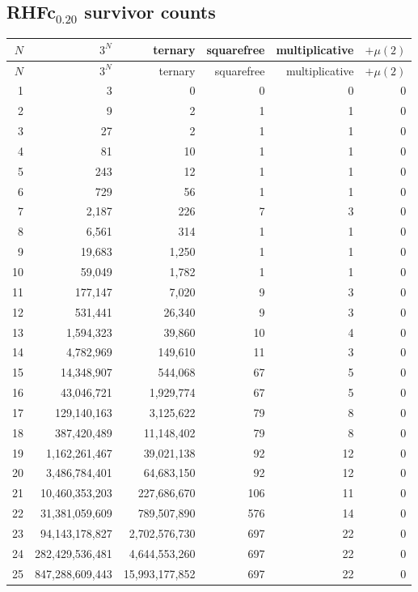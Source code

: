 \documentclass[11pt]{article}
\begin{document}
\subsection{RHFc$_{0.20}$ survivor counts}
\begin{center}\scriptsize\begin{longtable}{r r r r r r}
\toprule $N$ & $3^N$ & ternary & squarefree & multiplicative & $+\mu(2)$\\ \midrule\endfirsthead
\toprule $N$ & $3^N$ & ternary & squarefree & multiplicative & $+\mu(2)$\\ \midrule\endhead
1 & 3 & 0 & 0 & 0 & 0\\
2 & 9 & 2 & 1 & 1 & 0\\
3 & 27 & 2 & 1 & 1 & 0\\
4 & 81 & 10 & 1 & 1 & 0\\
5 & 243 & 12 & 1 & 1 & 0\\
6 & 729 & 56 & 1 & 1 & 0\\
7 & 2{,}187 & 226 & 7 & 3 & 0\\
8 & 6{,}561 & 314 & 1 & 1 & 0\\
9 & 19{,}683 & 1{,}250 & 1 & 1 & 0\\
10 & 59{,}049 & 1{,}782 & 1 & 1 & 0\\
11 & 177{,}147 & 7{,}020 & 9 & 3 & 0\\
12 & 531{,}441 & 26{,}340 & 9 & 3 & 0\\
13 & 1{,}594{,}323 & 39{,}860 & 10 & 4 & 0\\
14 & 4{,}782{,}969 & 149{,}610 & 11 & 3 & 0\\
15 & 14{,}348{,}907 & 544{,}068 & 67 & 5 & 0\\
16 & 43{,}046{,}721 & 1{,}929{,}774 & 67 & 5 & 0\\
17 & 129{,}140{,}163 & 3{,}125{,}622 & 79 & 8 & 0\\
18 & 387{,}420{,}489 & 11{,}148{,}402 & 79 & 8 & 0\\
19 & 1{,}162{,}261{,}467 & 39{,}021{,}138 & 92 & 12 & 0\\
20 & 3{,}486{,}784{,}401 & 64{,}683{,}150 & 92 & 12 & 0\\
21 & 10{,}460{,}353{,}203 & 227{,}686{,}670 & 106 & 11 & 0\\
22 & 31{,}381{,}059{,}609 & 789{,}507{,}890 & 576 & 14 & 0\\
23 & 94{,}143{,}178{,}827 & 2{,}702{,}576{,}730 & 697 & 22 & 0\\
24 & 282{,}429{,}536{,}481 & 4{,}644{,}553{,}260 & 697 & 22 & 0\\
25 & 847{,}288{,}609{,}443 & 15{,}993{,}177{,}852 & 697 & 22 & 0\\
\bottomrule\end{longtable}\end{center}
\end{document}

